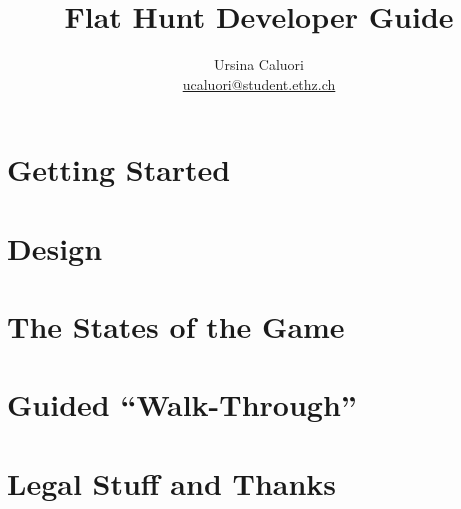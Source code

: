 \documentclass[a4paper,titlepage,12pt]{article}
\title{\textbf{Flat Hunt Developer Guide}}
\author{Ursina Caluori\\ \href{mailto: ucaluori@student.ethz.ch}{ucaluori@student.ethz.ch}}
\begin{document}
  \maketitle
  
  \tableofcontents

  \pagebreak

  
  
  \section{Getting Started}
    
  \section{Design}
    
  \section{The States of the Game}
     
  \section{Guided ``Walk-Through''}
    
  \section{Legal Stuff and Thanks}
    

  \hyperref[ugref]{}    
    
    
\end{document}
